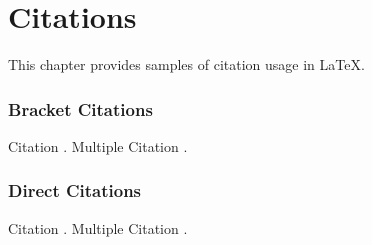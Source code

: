 

\chapter{Citations} \label{citations}

This chapter provides samples of citation usage in LaTeX.

\subsection{Bracket Citations} \label{bracket-citations}

Citation \citep{lastnamep:yearp}. Multiple Citation \citep{lastnamep:yearp,lastnamee:yeare,lastnamea:yeara}.

\subsection{Direct Citations} \label{direct-citations}

Citation \citet{lastnamep:yearp}. Multiple Citation \citet{lastnamep:yearp,lastnamee:yeare,lastnamea:yeara}.
